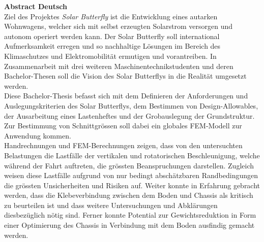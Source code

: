 \textbf{Abstract Deutsch}\\
Ziel des Projektes \emph{Solar Butterfly} ist die Entwicklung eines autarken Wohnwagens, welcher sich mit selbst erzeugten Solarstrom versorgen und autonom operiert werden kann. Der Solar Butterfly soll international Aufmerksamkeit erregen und so nachhaltige Lösungen im Bereich des Klimaschutzes und Elektromobilität ermutigen und vorantreiben. In Zusammenarbeit mit drei weiteren Maschinentechnikstudenten und deren Bachelor-Thesen soll die Vision des Solar Butterflys in die Realität umgesetzt werden.\\
Diese Bachelor-Thesis befasst sich mit dem Definieren der Anforderungen und Auslegungskriterien des Solar Butterflys, dem Bestimmen von Design-Allowables, der Ausarbeitung eines Lastenheftes und der Grobauslegung der Grundstruktur. Zur Bestimmung von Schnittgrössen soll dabei ein globales FEM-Modell zur Anwendung kommen.\\
Handrechnungen und FEM-Berechnungen zeigen, dass von den untersuchten Belastungen die Lastfälle der vertikalen und rotatorischen Beschleunigung, welche während der Fahrt auftreten, die grössten Beanspruchungen darstellen. Zugleich weisen diese Lastfälle aufgrund von nur bedingt abschätzbaren Randbedingungen die grössten Unsicherheiten und Risiken auf. Weiter konnte in Erfahrung gebracht werden, dass die Klebeverbindung zwischen dem Boden und Chassis als kritisch zu beurteilen ist und dass weitere Untersuchungen und Abklärungen diesbezüglich nötig sind.
Ferner konnte Potential zur Gewichtsreduktion in Form einer Optimierung des Chassis in Verbindung mit dem Boden ausfindig gemacht werden.


